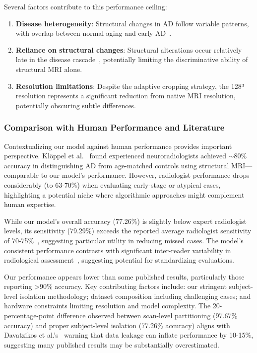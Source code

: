 \documentclass[12pt, a4paper]{article}
\begin{document}
Several factors contribute to this performance ceiling:

\begin{enumerate}
    \item \textbf{Disease heterogeneity}: Structural changes in AD follow variable patterns, with overlap between normal aging and early AD~\cite{vemuri2010role}.
    
    \item \textbf{Reliance on structural changes}: Structural alterations occur relatively late in the disease cascade~\cite{jack2013tracking}, potentially limiting the discriminative ability of structural MRI alone.
    
    \item \textbf{Resolution limitations}: Despite the adaptive cropping strategy, the 128³ resolution represents a significant reduction from native MRI resolution, potentially obscuring subtle differences.
\end{enumerate}

\subsubsection{Comparison with Human Performance and Literature}

Contextualizing our model against human performance provides important perspective. Klöppel et al.~\cite{kloppel2008accuracy} found experienced neuroradiologists achieved $\sim$80\% accuracy in distinguishing AD from age-matched controls using structural MRI—comparable to our model's performance. However, radiologist performance drops considerably (to 63-70\%) when evaluating early-stage or atypical cases, highlighting a potential niche where algorithmic approaches might complement human expertise.

While our model's overall accuracy (77.26\%) is slightly below expert radiologist levels, its sensitivity (79.29\%) exceeds the reported average radiologist sensitivity of 70-75\%~\cite{frisoni2010clinical}, suggesting particular utility in reducing missed cases. The model's consistent performance contrasts with significant inter-reader variability in radiological assessment~\cite{kloppel2008accuracy}, suggesting potential for standardizing evaluations.

Our performance appears lower than some published results, particularly those reporting >90\% accuracy. Key contributing factors include: our stringent subject-level isolation methodology; dataset composition including challenging cases; and hardware constraints limiting resolution and model complexity. The 20-percentage-point difference observed between scan-level partitioning (97.67\% accuracy) and proper subject-level isolation (77.26\% accuracy) aligns with Davatzikos et al.'s~\cite{davatzikos2019machine} warning that data leakage can inflate performance by 10-15\%, suggesting many published results may be substantially overestimated.
\end{document}
